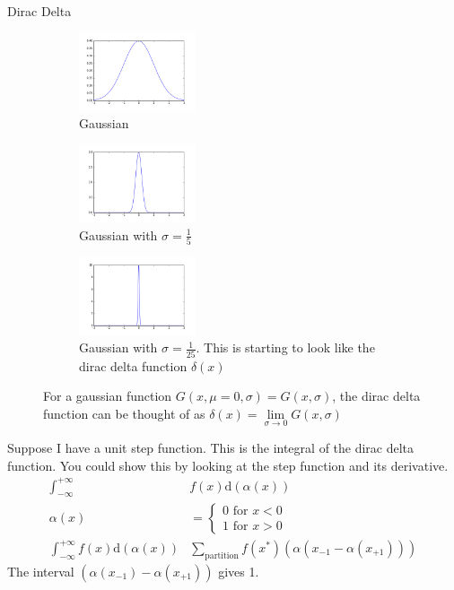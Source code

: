 \documentclass{article}
\renewcommand{\d}[0]{\mathrm{d}}
\begin{document}
\begin{section}{}
\begin{subsection}{Dirac Delta}
		\begin{figure}[h]
			\centering
			\begin{subfigure}[t]{0.4\textwidth}
				\centering
				\includegraphics[height=65pt]{gaussian}
				\caption{Gaussian}
				\label{fig:Gauss}
			\end{subfigure}
			\begin{subfigure}[t]{0.4\textwidth}
				\centering
				\includegraphics[height=65pt]{sharpgauss}
				\caption{Gaussian with $\sigma = \frac{1}{5}$}
				\label{fig:sharpGauss}
			\end{subfigure}
			\begin{subfigure}[t]{0.5\textwidth}
				\centering
				\includegraphics[height=65pt]{verysharpgauss}
				\caption{Gaussian with $\sigma = \frac{1}{25}$. This is starting to look like the dirac delta function $\delta(x)$}
				\label{fig:almostdirac}
			\end{subfigure}
			\caption{For a gaussian function $G(x,\mu=0,\sigma) = G(x,\sigma)$, the dirac delta function can be thought of as $\delta(x) = \lim\limits_{\sigma\rightarrow 0}G(x,\sigma)$}
		\end{figure}
		Suppose I have a unit step function. This is the integral of the dirac delta function. You could show this by looking at the step function and its derivative.
		\begin{align*}
			\int_{-\infty}^{+\infty}&f(x)\d(\alpha(x))\\
			\alpha(x) &= \begin{cases}0\text{ for }x<0\\1\text{ for }x>0\end{cases}\\
			\int_{-\infty}^{+\infty}f(x)\d(\alpha(x))  &\sum_{\text{partition}}f(x^\ast)(\alpha(x_{-1}-\alpha(x_{+1})))
		\end{align*}
The interval $(\alpha(x_{-1})-\alpha(x_{+1}))$ gives 1.


\end{subsection}
\end{section}
\end{document}

